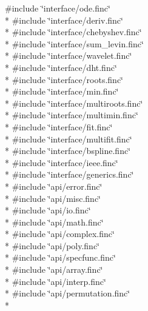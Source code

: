 {\ttfamily \#include \char`\"{}interface/ode.\-finc\char`\"{}}\\*
{\ttfamily \#include \char`\"{}interface/deriv.\-finc\char`\"{}}\\*
{\ttfamily \#include \char`\"{}interface/chebyshev.\-finc\char`\"{}}\\*
{\ttfamily \#include \char`\"{}interface/sum\-\_\-levin.\-finc\char`\"{}}\\*
{\ttfamily \#include \char`\"{}interface/wavelet.\-finc\char`\"{}}\\*
{\ttfamily \#include \char`\"{}interface/dht.\-finc\char`\"{}}\\*
{\ttfamily \#include \char`\"{}interface/roots.\-finc\char`\"{}}\\*
{\ttfamily \#include \char`\"{}interface/min.\-finc\char`\"{}}\\*
{\ttfamily \#include \char`\"{}interface/multiroots.\-finc\char`\"{}}\\*
{\ttfamily \#include \char`\"{}interface/multimin.\-finc\char`\"{}}\\*
{\ttfamily \#include \char`\"{}interface/fit.\-finc\char`\"{}}\\*
{\ttfamily \#include \char`\"{}interface/multifit.\-finc\char`\"{}}\\*
{\ttfamily \#include \char`\"{}interface/bspline.\-finc\char`\"{}}\\*
{\ttfamily \#include \char`\"{}interface/ieee.\-finc\char`\"{}}\\*
{\ttfamily \#include \char`\"{}interface/generics.\-finc\char`\"{}}\\*
{\ttfamily \#include \char`\"{}api/error.\-finc\char`\"{}}\\*
{\ttfamily \#include \char`\"{}api/misc.\-finc\char`\"{}}\\*
{\ttfamily \#include \char`\"{}api/io.\-finc\char`\"{}}\\*
{\ttfamily \#include \char`\"{}api/math.\-finc\char`\"{}}\\*
{\ttfamily \#include \char`\"{}api/complex.\-finc\char`\"{}}\\*
{\ttfamily \#include \char`\"{}api/poly.\-finc\char`\"{}}\\*
{\ttfamily \#include \char`\"{}api/specfunc.\-finc\char`\"{}}\\*
{\ttfamily \#include \char`\"{}api/array.\-finc\char`\"{}}\\*
{\ttfamily \#include \char`\"{}api/interp.\-finc\char`\"{}}\\*
{\ttfamily \#include \char`\"{}api/permutation.\-finc\char`\"{}}\\*
